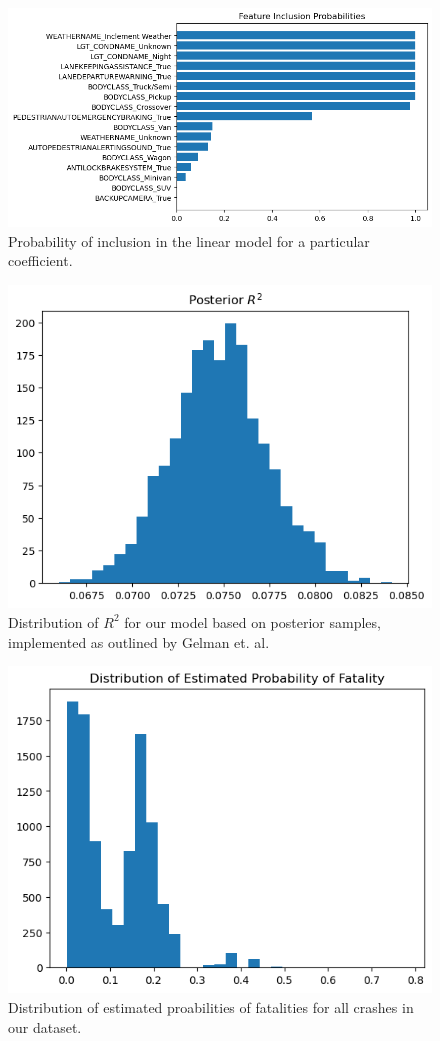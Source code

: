 \documentclass[12pt]{article}
\begin{document}
\begin{figure}[h]
    \centering
    \includegraphics[width=\textwidth]{images/inclusion_probs.png}
    \caption{Probability of inclusion in the linear model for a particular coefficient.}
    \label{fig:inclusion_probs}
\end{figure}

\begin{figure}[h]
    \centering
    \includegraphics[width=\textwidth]{images/R2_dist.png}
    \caption{Distribution of $R^2$ for our model based on posterior samples, implemented as outlined by Gelman et. al.}
    \label{fig:r2_dist}
\end{figure}

\begin{figure}[h]
    \centering
    \includegraphics[width=\textwidth]{images/prob_dist.png}
    \caption{Distribution of estimated proabilities of fatalities for all crashes in our dataset.}
    \label{fig:prob_dist}
\end{figure}
\end{document}
